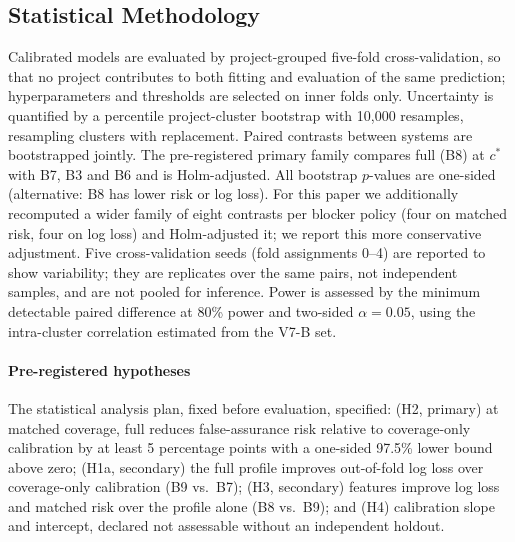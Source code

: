\subsection{Statistical Methodology}
Calibrated models are evaluated by project-grouped five-fold cross-validation, so that no project contributes to both fitting and evaluation of the same prediction; hyperparameters and thresholds are selected on inner folds only. Uncertainty is quantified by a percentile project-cluster bootstrap with 10{,}000 resamples, resampling clusters with replacement. Paired contrasts between systems are bootstrapped jointly. The pre-registered primary family compares full \cec{} (B8) at $c^\ast$ with B7, B3 and B6 and is Holm-adjusted. All bootstrap $p$-values are one-sided (alternative: B8 has lower risk or log loss). For this paper we additionally recomputed a wider family of eight contrasts per blocker policy (four on matched risk, four on log loss) and Holm-adjusted it; we report this more conservative adjustment. Five cross-validation seeds (fold assignments 0--4) are reported to show variability; they are replicates over the same pairs, not independent samples, and are not pooled for inference. Power is assessed by the minimum detectable paired difference at 80\% power and two-sided $\alpha=0.05$, using the intra-cluster correlation estimated from the V7-B \NDO{} set.

\paragraph*{Pre-registered hypotheses} The statistical analysis plan, fixed before evaluation, specified: (H2, primary) at matched coverage, full \cec{} reduces false-assurance risk relative to coverage-only calibration by at least 5 percentage points with a one-sided 97.5\% lower bound above zero; (H1a, secondary) the full profile improves out-of-fold log loss over coverage-only calibration (B9 vs.\ B7); (H3, secondary) \ers{} features improve log loss and matched risk over the profile alone (B8 vs.\ B9); and (H4) calibration slope and intercept, declared not assessable without an independent holdout.
